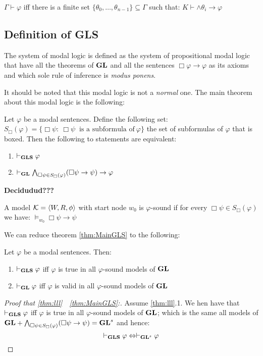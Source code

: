 \documentclass[../main.tex]{subfiles}
\begin{document}
\begin{lem}
	$\Gamma\vdash\varphi$ iff there is a finite set
$\{\theta_0,\ldots,\theta_{n-1}\}\subseteq \Gamma$ such that:
$K\vdash\wedge\theta_i\rightarrow\varphi$
\end{lem}

\subsection{Definition of \textbf{GLS}}
\begin{defi}
	The system of modal logic  is defined as the system
	of propositional modal logic that have all the theorems of $\text{\textbf{GL}}$ and
	 all the sentences $\Box\varphi\rightarrow\varphi$ as its axioms and which sole
	rule of inference is \textit{modus ponens}. 
\end{defi}
It should be noted that this modal logic is not a \textit{normal} one.
The main theorem about this modal logic is the following:
\begin{thm}
	\label{thm:MainGLS}
	Let $\varphi$ be a modal sentences. Define the following set: $S_\Box(\varphi)=\{\Box\psi:\
	\Box\psi\ \text{ is a subformula of}\ \varphi\}$ the set of
	subformulas of $\varphi$ that is boxed. Then the following to
	statements are equivalent:
	\begin{enumerate}
		\item $\vdash_{\text{\textbf{GLS}}}\varphi$
		\item $\vdash_{\text{\textbf{GL}}}\bigwedge_{\Box\psi\in
			S_\Box(\varphi)}(\Box\psi\rightarrow\psi)\rightarrow\varphi$
	\end{enumerate}
\end{thm}

\textbf{Decidudud???}

\begin{defi}
	A model $\mathcal{K}=\langle W,R,\phi\rangle$ with start node $w_0$ is $\varphi$-sound if for every
	$\Box\psi\in S_\Box(\varphi)$  we have:
	$\vDash_{w_0}\Box\psi\rightarrow\psi$
\end{defi}
We can reduce theorem \ref{thm:MainGLS} to the following:
\begin{thm}
	\label{thm:lll}
	Let $\varphi$ be a modal sentences. Then:
	\begin{enumerate}
		\item $\vdash_{\text{\textbf{GLS}}}\varphi$ iff $\varphi$ is true in all
			$\varphi$-sound models of $\text{\textbf{GL}}$
		\item $\vdash_{\text{\textbf{GL}}}\varphi$ iff $\varphi$ is valid in all
			$\varphi$-sound models of $\text{\textbf{GL}}$
	\end{enumerate}
\end{thm}
\begin{proof}[Proof that \ref{thm:lll}\ \Rightarrow\ \ref{thm:MainGLS}:]
	Assume \ref{thm:lll}.1. We hen have that $\vdash_{\text{\textbf{GLS}}}\varphi$ iff $\varphi$ is true in all
	$\varphi$-sound models of $\text{\textbf{GL}}$; which is the same all models of
	$\text{\textbf{GL}}+\bigwedge_{\Box\psi\in S_\Box(\varphi)}(\Box\psi\rightarrow\psi)=\text{\textbf{GL}}^s$ and hence:
	$$\vdash_{\text{\textbf{GLS}}}\varphi\Leftrightarrow\vdash_{\text{\textbf{GL}}^s}\varphi$$
\end{proof}
\end{document}
